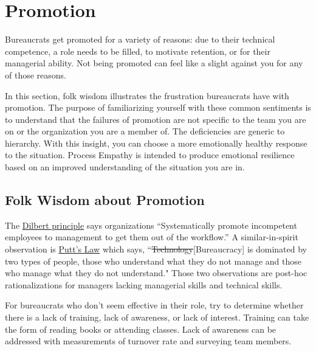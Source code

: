 \section{Promotion\label{sec:promotion}}

Bureaucrats get promoted for a variety of reasons: due to their technical competence, a role needs to be filled, to motivate retention, or for their managerial ability.  Not being promoted can feel like a slight against you for any of those reasons. 

In this section, folk wisdom illustrates the frustration bureaucrats have with promotion. The purpose of familiarizing yourself with these common sentiments is to understand that the failures of promotion are not specific to the team you are on or the organization you are a member of. The deficiencies are generic to hierarchy. With this insight, you can choose a more emotionally healthy response to the situation. Process Empathy is intended to produce emotional resilience based on an improved understanding of the situation you are in.

\subsection*{Folk Wisdom about Promotion}

The 
\href{https://en.wikipedia.org/wiki/Dilbert_principle}{Dilbert principle}
%
%
%
says organizations
``Systematically promote incompetent employees to management to get them out of the workflow.''
A similar-in-spirit observation is 
\href{https://en.wikipedia.org/wiki/Putt\%27s_Law_and_the_Successful_Technocrat}{Putt's Law}
%
%
which says,
``\sout{Technology}[Bureaucracy] is dominated by two types of people, those who understand what they do not manage and those who manage what they do not understand."
Those two observations are post-hoc rationalizations for managers lacking managerial skills and technical skills. 

For bureaucrats who don't seem effective in their role, try to determine whether there is a lack of training, lack of awareness, or lack of interest. 
%
%
Training can take the form of reading books or attending classes. Lack of awareness can be addressed with measurements of turnover rate and surveying team members. 



